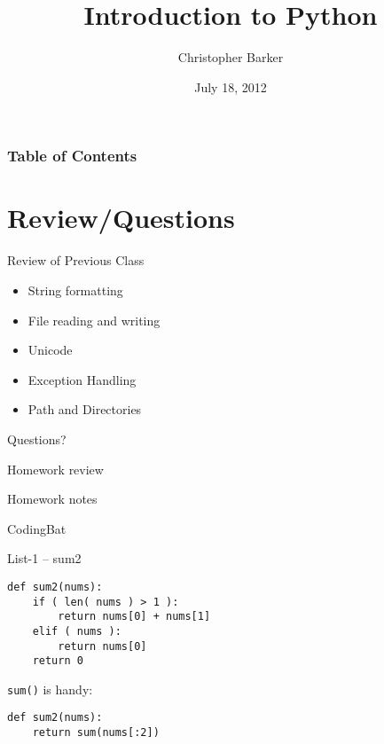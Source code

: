 \documentclass{beamer}
\title[Intro to Python: Week 4]{Introduction  to Python}
\author{Christopher Barker}
\institute{UW Continuing Education / Isilon}
\date{July 18, 2012}
\begin{document}
\begin{frame}
  \titlepage
\end{frame}

\begin{frame}
\frametitle{Table of Contents}
  \tableofcontents
\end{frame}


\section{Review/Questions}

\begin{frame}{Review of Previous Class}

\begin{itemize}
  \item String formatting
  \item File reading and writing
  \item Unicode
  \item Exception Handling
  \item Path and Directories
\end{itemize}

\vfill
{\Large Questions?}
\end{frame}


\begin{frame}{Homework review}

  {\Large Homework notes }

\end{frame}

\begin{frame}[fragile]{CodingBat}

{\Large List-1 -- sum2}

\begin{verbatim}
def sum2(nums):
    if ( len( nums ) > 1 ):
        return nums[0] + nums[1]
    elif ( nums ):
        return nums[0]
    return 0
\end{verbatim}

{\Large \verb|sum()| is handy: }

\begin{verbatim}
def sum2(nums):
    return sum(nums[:2])
\end{verbatim}


\end{frame} 
\end{document}
